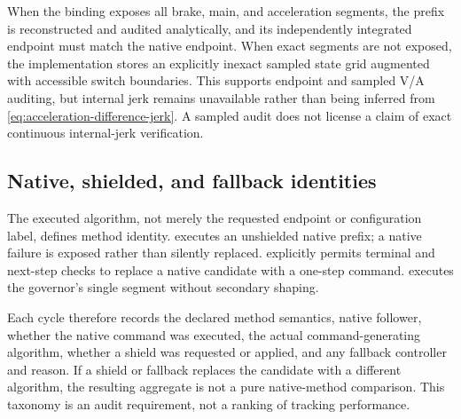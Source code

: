 When the binding exposes all brake, main, and acceleration segments, the
prefix is reconstructed and audited analytically, and its independently
integrated endpoint must match the native endpoint.  When exact segments are
not exposed, the implementation stores an explicitly inexact sampled state
grid augmented with accessible switch boundaries.  This supports endpoint and
sampled V/A auditing, but internal jerk remains unavailable rather than being
inferred from \eqref{eq:acceleration-difference-jerk}.  A sampled audit does not
license a claim of exact continuous internal-jerk verification.

\subsection{Native, shielded, and fallback identities}

The executed algorithm, not merely the requested endpoint or configuration
label, defines method identity.  \emph{\OrdinaryRuckig{}} executes an
unshielded native prefix; a native failure is exposed rather than silently
replaced.  \emph{\ViabilityShieldedRuckig{}} explicitly permits terminal and
next-step checks to replace a native candidate with a one-step command.
\emph{\DirectConstantJerkExecution{}} executes the governor's single segment
without secondary \Ruckig{} shaping.

Each cycle therefore records the declared method semantics, native follower,
whether the native command was executed, the actual command-generating
algorithm, whether a shield was requested or applied, and any fallback
controller and reason.  If a shield or fallback replaces the candidate with a
different algorithm, the resulting aggregate is not a pure native-method
comparison.  This taxonomy is an audit requirement, not a ranking of tracking
performance.
